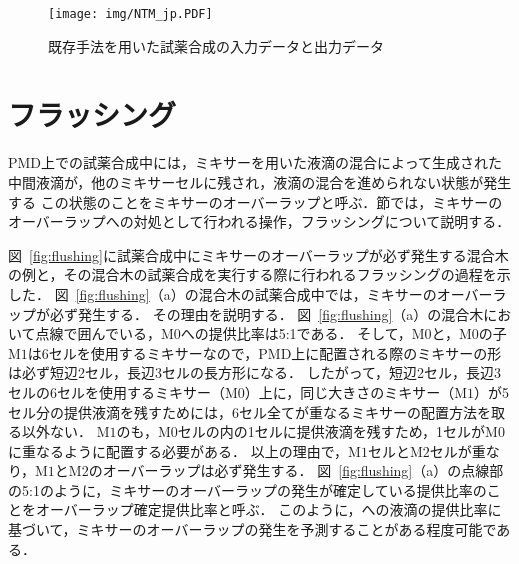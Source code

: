 \begin{figure}[tbp]
    \centering\texttt{[image: img/NTM\_jp.PDF]}
    \caption{既存手法を用いた試薬合成の入力データと出力データ}\label{fig:NTM}
\end{figure}


\section{フラッシング}
\label{sec:flushing}
    PMD上での試薬合成中には，ミキサーを用いた液滴の混合によって生成された中間液滴が，他のミキサーセルに残され，液滴の混合を進められない状態が発生する
    この状態のことをミキサーのオーバーラップと呼ぶ．節では，ミキサーのオーバーラップへの対処として行われる操作，フラッシングについて説明する．
    
    図~\ref{fig:flushing}に試薬合成中にミキサーのオーバーラップが必ず発生する混合木の例と，その混合木の試薬合成を実行する際に行われるフラッシングの過程を示した．
    図~\ref{fig:flushing}（a）の混合木の試薬合成中では，ミキサーのオーバーラップが必ず発生する．
    その理由を説明する．
    図~\ref{fig:flushing}（a）の混合木において点線で囲んでいる，M$0$への提供比率は5:1である．
    そして，M$0$と，M$0$の子M$1$は6セルを使用するミキサーなので，PMD上に配置される際のミキサーの形は必ず短辺2セル，長辺3セルの長方形になる．
    したがって，短辺2セル，長辺3セルの6セルを使用するミキサー（M$0$）上に，同じ大きさのミキサー（M$1$）が5セル分の提供液滴を残すためには，6セル全てが重なるミキサーの配置方法を取る以外ない．
    M$1$のも，M$0$セルの内の1セルに提供液滴を残すため，1セルがM$0$に重なるように配置する必要がある．
    以上の理由で，M$1$セルとM$2$セルが重なり，M$1$とM$2$のオーバーラップは必ず発生する．
    図~\ref{fig:flushing}（a）の点線部の5:1のように，ミキサーのオーバーラップの発生が確定している提供比率のことをオーバーラップ確定提供比率と呼ぶ．
    このように，への液滴の提供比率に基づいて，ミキサーのオーバーラップの発生を予測することがある程度可能である．
    
